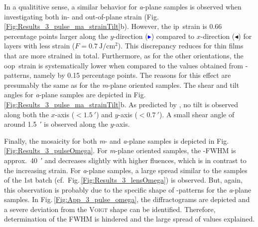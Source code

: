In a qualititive sense, a similar behavior for \textit{a}-plane samples is observed when investigating both in- and out-of-plane strain (Fig.\,\ref{Fig:Results_3_pulse_ma_strainTilt}b).
However, the \gls{ip}\ strain is 0.66 percentage points larger along the $y$-direction (\textcolor{blue}{$\blacktriangleright$}) compared to $x$-direction (\textcolor{col-purple}{$\blacktriangleleft$}) for layers with less strain ($F=\qty{0.7}{\J\per\cm\squared}$).
This discrepancy reduces for thin films that are more strained in total.
Furthermore, as for the other orientations, the \gls{oop}\ strain is systematically lower when compared to the values obtained from \thetaomega-patterns, namely by 0.15 percentage points.
The reasons for this effect are presumably the same as for the \textit{m}-plane oriented samples.
The shear and tilt angles for \textit{a}-plane samples are depicted in Fig.\,\ref{Fig:Results_3_pulse_ma_strainTilt}b.
As predicted by \textcite{grundmann2018}, no tilt is observed along both the $x$-axis ($<\qty{1.5}{\arcminute}$) and $y$-axis ($<\qty{0.7}{\arcminute}$).
A small shear angle of around \qty{1.5}{\arcminute} is observed along the $y$-axis.

Finally, the mosaicity for both \textit{m}- and \textit{a}-plane samples is depicted in Fig.\,\ref{Fig:Results_3_pulseOmega}.
For \textit{m}-plane oriented samples, the \textomega-FWHM is approx.\ \qty{40}{\arcminute} and decreases slightly with higher fluences, which is in contrast to the increasing strain.
For \textit{a}-plane samples, a large spread similar to the samples of the 1st batch (cf.\ Fig.\,\ref{Fig:Results_3_lensOmega}) is observed.
But, again, this observation is probably due to the specific shape of \textomega-patterns for the \textit{a}-plane samples.
In Fig.\,\ref{Fig:App_3_pulse_omega}, the diffractograms are depicted and a severe deviation from the \textsc{Voigt} shape can be identified.
Therefore, determination of the \gls{FWHM} is hindered and the large spread of values explained.

